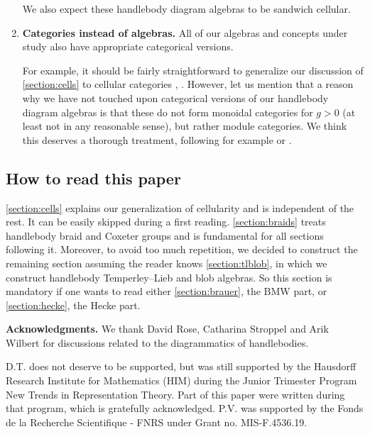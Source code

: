 \documentclass[a4paper,11pt]{amsart}
\numberwithin{equation}{section}
\let\fullref\autoref
\begin{document}
\begin{enumerate}[label=$\bullet$]
We also expect these handlebody diagram 
algebras to be sandwich cellular.

\item \textbf{Categories instead of algebras.}
All of our algebras and concepts under study also have appropriate 
categorical versions.

For example, it should be fairly straightforward 
to generalize our discussion of \fullref{section:cells} 
to cellular categories \cite{We-tensors-cellular-categories},
\cite{ElLa-trace-hecke}.
However, let us mention that a reason why we have not 
touched upon categorical versions of our handlebody diagram 
algebras is that these do not form monoidal categories 
for $g>0$ (at least not in any reasonable sense), but 
rather module categories. We think this deserves a thorough 
treatment, following for example \cite{HaOl-actions-tensor-categories} 
or \cite{SaTu}.

\end{enumerate}

\subsection{How to read this paper}

\fullref{section:cells} explains our generalization 
of cellularity and is independent of the rest. It can be easily skipped 
during a first reading.
\fullref{section:braids}
treats handlebody braid and Coxeter groups and
is fundamental for 
all sections following it. Moreover, to avoid 
too much repetition, we decided to construct the remaining section 
assuming the reader knows \fullref{section:tlblob}, in which we
construct handlebody Temperley--Lieb and blob algebras. So 
this section is mandatory if one wants to read either \fullref{section:brauer}, the BMW part, 
or \fullref{section:hecke}, the Hecke part.

\medskip

\noindent\textbf{Acknowledgments.}
We thank David Rose, Catharina Stroppel and Arik Wilbert for discussions related 
to the diagrammatics of handlebodies.

D.T. does not deserve to be supported, but was still supported
by the Hausdorff Research Institute for Mathematics (HIM) 
during the Junior Trimester Program New Trends in Representation Theory.
Part of this paper were written during that program, which 
is gratefully acknowledged.
P.V. was supported by the Fonds de la Recherche
Scientifique - FNRS under Grant no. MIS-F.4536.19.
\end{document}
